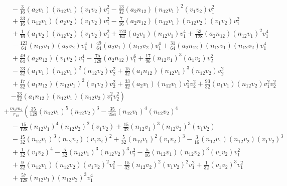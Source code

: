 \documentclass[prd,preprint,superscriptaddress,tightenlines,nofootinbib,
  eqsecnum,showpacs]{revtex4}
\begin{document}
{\begin{subequations}
\begin{align}
& \quad -  \frac{3}{16} (a_2 v_1) (n_{12} v_1) (v_1 v_2) v_1^{2}
 -  \frac{13}{32} (a_2 n_{12}) (n_{12} v_1)^2 (v_1 v_2) v_1^{2}\nonumber\\
& \quad + \frac{33}{16} (n_{12} v_1) (a_2 v_2) (v_1 v_2) v_1^{2}
 -  \frac{7}{16} (a_2 n_{12}) (n_{12} v_1) (n_{12} v_2) (v_1 v_2) v_1^{2}\nonumber\\
& \quad + \frac{1}{16} (a_1 v_2) (n_{12} v_2) (v_1 v_2) v_1^{2}
 + \frac{123}{64} (a_2 v_1) (n_{12} v_1) v_1^{4}
 + \frac{53}{128} (a_2 n_{12}) (n_{12} v_1)^2 v_1^{4}\nonumber\\
& \quad -  \frac{123}{64} (n_{12} v_1) (a_2 v_2) v_1^{4}
 + \frac{49}{64} (a_2 v_1) (n_{12} v_2) v_1^{4}
 + \frac{31}{64} (a_2 n_{12}) (n_{12} v_1) (n_{12} v_2) v_1^{4}\nonumber\\
& \quad + \frac{49}{64} (a_2 n_{12}) (v_1 v_2) v_1^{4}
 -  \frac{75}{128} (a_2 n_{12}) v_1^{6}
 + \frac{17}{96} (n_{12} v_1)^3 (a_1 v_2) v_2^{2}\nonumber\\
& \quad -  \frac{23}{32} (a_1 v_1) (n_{12} v_1)^2 (n_{12} v_2) v_2^{2}
 + \frac{15}{32} (a_1 n_{12}) (n_{12} v_1)^3 (n_{12} v_2) v_2^{2}\nonumber\\
& \quad + \frac{17}{32} (a_1 n_{12}) (n_{12} v_1)^2 (v_1 v_2) v_2^{2}
 + \frac{33}{32} (a_2 v_1) (n_{12} v_1) v_1^{2} v_2^{2}
 + \frac{93}{32} (a_1 v_1) (n_{12} v_2) v_1^{2} v_2^{2}\nonumber\\
& \quad \left.  -  \frac{23}{32} (a_1 n_{12}) (n_{12} v_1) 
(n_{12} v_2) v_1^{2} v_2^{2}\right)\nonumber\\
 &+ \frac{m_1 m_2}{r_{12}} \left(\frac{35}{128} (n_{12} v_1)^5 (n_{12} v_2)^3
 -  \frac{35}{256} (n_{12} v_1)^4 (n_{12} v_2)^4\right.\nonumber\\
& \quad -  \frac{15}{128} (n_{12} v_1)^4 (n_{12} v_2)^2 (v_1 v_2)
 + \frac{15}{32} (n_{12} v_1)^3 (n_{12} v_2)^3 (v_1 v_2)\nonumber\\
& \quad -  \frac{15}{32} (n_{12} v_1)^3 (n_{12} v_2) (v_1 v_2)^2
 + \frac{5}{32} (n_{12} v_1)^2 (v_1 v_2)^3
 -  \frac{3}{16} (n_{12} v_1) (n_{12} v_2) (v_1 v_2)^3\nonumber\\
& \quad + \frac{1}{32} (v_1 v_2)^4
 -  \frac{5}{32} (n_{12} v_1)^3 (n_{12} v_2)^3 v_1^{2}
 -  \frac{5}{16} (n_{12} v_1) (n_{12} v_2)^3 (v_1 v_2) v_1^{2}\nonumber\\
& \quad + \frac{9}{32} (n_{12} v_1) (n_{12} v_2) (v_1 v_2)^2 v_1^{2}
 -  \frac{15}{32} (n_{12} v_2)^2 (v_1 v_2)^2 v_1^{2}
 + \frac{1}{32} (v_1 v_2)^3 v_1^{2}\nonumber\\
& \quad + \frac{57}{128} (n_{12} v_1) (n_{12} v_2)^3 v_1^{4}

\end{align}
\end{subequations}}
\end{document}
